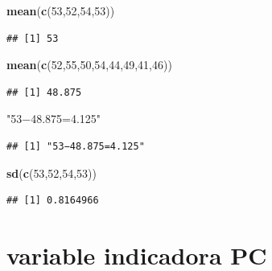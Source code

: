 \documentclass[
]{article}
\newenvironment{Shaded}{\begin{snugshade}}{\end{snugshade}}
\newcommand{\DecValTok}[1]{\textcolor[rgb]{0.00,0.00,0.81}{#1}}
\newcommand{\FunctionTok}[1]{\textcolor[rgb]{0.13,0.29,0.53}{\textbf{#1}}}
\newcommand{\NormalTok}[1]{#1}
\newcommand{\StringTok}[1]{\textcolor[rgb]{0.31,0.60,0.02}{#1}}
\begin{document}
\begin{Shaded}
\begin{Highlighting}[]
\FunctionTok{mean}\NormalTok{(}\FunctionTok{c}\NormalTok{(}\DecValTok{53}\NormalTok{,}\DecValTok{52}\NormalTok{,}\DecValTok{54}\NormalTok{,}\DecValTok{53}\NormalTok{))}
\end{Highlighting}
\end{Shaded}

\begin{verbatim}
## [1] 53
\end{verbatim}

\begin{Shaded}
\begin{Highlighting}[]
\FunctionTok{mean}\NormalTok{(}\FunctionTok{c}\NormalTok{(}\DecValTok{52}\NormalTok{,}\DecValTok{55}\NormalTok{,}\DecValTok{50}\NormalTok{,}\DecValTok{54}\NormalTok{,}\DecValTok{44}\NormalTok{,}\DecValTok{49}\NormalTok{,}\DecValTok{41}\NormalTok{,}\DecValTok{46}\NormalTok{))}
\end{Highlighting}
\end{Shaded}

\begin{verbatim}
## [1] 48.875
\end{verbatim}

\begin{Shaded}
\begin{Highlighting}[]
\StringTok{"53−48.875=4.125"}
\end{Highlighting}
\end{Shaded}

\begin{verbatim}
## [1] "53−48.875=4.125"
\end{verbatim}

\begin{Shaded}
\begin{Highlighting}[]
\FunctionTok{sd}\NormalTok{(}\FunctionTok{c}\NormalTok{(}\DecValTok{53}\NormalTok{,}\DecValTok{52}\NormalTok{,}\DecValTok{54}\NormalTok{,}\DecValTok{53}\NormalTok{))}
\end{Highlighting}
\end{Shaded}

\begin{verbatim}
## [1] 0.8164966
\end{verbatim}

\section{variable indicadora PC}\label{variable-indicadora-pc}
\end{document}
